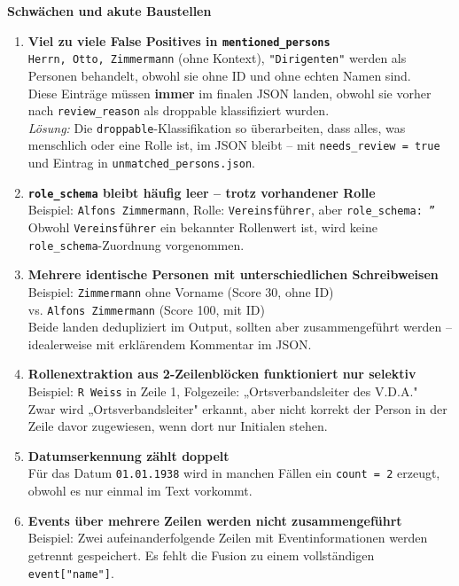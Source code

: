 \documentclass{article}
\begin{document}
\textbf{Schwächen und akute Baustellen}
\begin{enumerate}
    \item \textbf{Viel zu viele False Positives in \texttt{mentioned\_persons}}\\
    \texttt{Herrn, Otto, Zimmermann} (ohne Kontext), \texttt{"Dirigenten"} \textrightarrow{} werden als Personen behandelt, obwohl sie ohne ID und ohne echten Namen sind.\\
    Diese Einträge müssen \textbf{immer} im finalen JSON landen, obwohl sie vorher nach \texttt{review\_reason} als droppable klassifiziert wurden.\\
    \textit{Lösung:} Die \texttt{droppable}-Klassifikation so überarbeiten, dass alles, was menschlich oder eine Rolle ist, im JSON bleibt – mit \verb|needs_review = true| und Eintrag in \texttt{unmatched\_persons.json}.
    
    \item \textbf{\texttt{role\_schema} bleibt häufig leer – trotz vorhandener Rolle}\\
    Beispiel: \texttt{Alfons Zimmermann}, Rolle: \texttt{Vereinsführer}, aber \texttt{role\_schema: ''}\\
    Obwohl \texttt{Vereinsführer} ein bekannter Rollenwert ist, wird keine \texttt{role\_schema}-Zuordnung vorgenommen.
    
    \item \textbf{Mehrere identische Personen mit unterschiedlichen Schreibweisen}\\
    Beispiel: \texttt{Zimmermann} ohne Vorname (Score 30, ohne ID)\\
    vs. \texttt{Alfons Zimmermann} (Score 100, mit ID)\\
    Beide landen dedupliziert im Output, sollten aber zusammengeführt werden – idealerweise mit erklärendem Kommentar im JSON.
    
    \item \textbf{Rollenextraktion aus 2-Zeilenblöcken funktioniert nur selektiv}\\
    Beispiel: \texttt{R Weiss} in Zeile 1, Folgezeile: „Ortsverbandsleiter des V.D.A."\\
    Zwar wird „Ortsverbandsleiter" erkannt, aber nicht korrekt der Person in der Zeile davor zugewiesen, wenn dort nur Initialen stehen.
    
    \item \textbf{Datumserkennung zählt doppelt}\\
    Für das Datum \texttt{01.01.1938} wird in manchen Fällen ein \texttt{count = 2} erzeugt, obwohl es nur einmal im Text vorkommt.
    
    \item \textbf{Events über mehrere Zeilen werden nicht zusammengeführt}\\
    Beispiel: Zwei aufeinanderfolgende Zeilen mit Eventinformationen werden getrennt gespeichert. Es fehlt die Fusion zu einem vollständigen \texttt{event["name"]}.
\end{enumerate}
\end{document}
